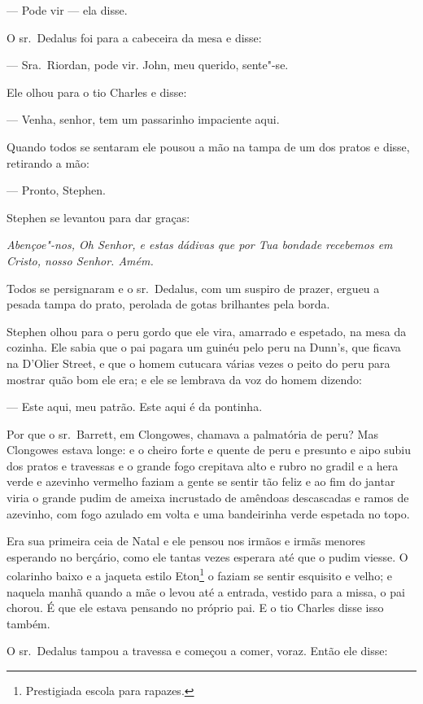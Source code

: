  --- Pode vir --- ela disse.

O sr.~Dedalus foi para a cabeceira da mesa e disse:

 --- Sra.~Riordan, pode vir. John, meu querido, sente"-se.

Ele olhou para o tio Charles e disse:

 --- Venha, senhor, tem um passarinho impaciente aqui.

Quando todos se sentaram ele pousou a mão na tampa de um dos pratos e
disse, retirando a mão:

 --- Pronto, Stephen.

Stephen se levantou para dar graças:

\smallskip

{\itshape
Abençoe"-nos, Oh Senhor, e estas dádivas que por Tua bondade recebemos em
Cristo, nosso Senhor. Amém.}

\smallskip

Todos se persignaram e o sr.~Dedalus, com um suspiro de prazer, ergueu a
pesada tampa do prato, perolada de gotas brilhantes pela borda.

Stephen olhou para o peru gordo que ele vira, amarrado e espetado, na
mesa da cozinha. Ele sabia que o pai pagara um guinéu pelo peru na
Dunn’s, que ficava na D’Olier Street,
e que o homem cutucara várias vezes o peito do peru para mostrar quão
bom ele era; e ele se lembrava da voz do homem dizendo:

 --- Este aqui, meu patrão. Este aqui é da pontinha. 

Por que o sr.~Barrett, em Clongowes, chamava a palmatória de peru? Mas
Clongowes estava longe: e o cheiro forte e quente de peru e presunto e
aipo subiu dos pratos e travessas e o grande fogo crepitava alto e
rubro no gradil e a hera verde e azevinho vermelho faziam a gente se
sentir tão feliz e ao fim do jantar viria o grande pudim de ameixa
incrustado de amêndoas descascadas e ramos de azevinho, com fogo
azulado em volta e uma bandeirinha verde espetada no topo.

Era sua primeira ceia de Natal e ele pensou nos irmãos e irmãs menores
esperando no berçário, como ele tantas vezes esperara até que o pudim
viesse. O colarinho baixo e a jaqueta estilo Eton\footnote{ Prestigiada
escola para rapazes.} o faziam se sentir esquisito e velho; e naquela
manhã quando a mãe o levou até a entrada, vestido para a missa, o pai
chorou. É que ele estava pensando no próprio pai. E o tio Charles disse
isso também.

O sr.~Dedalus tampou a travessa e começou a comer, voraz. Então ele
disse:

